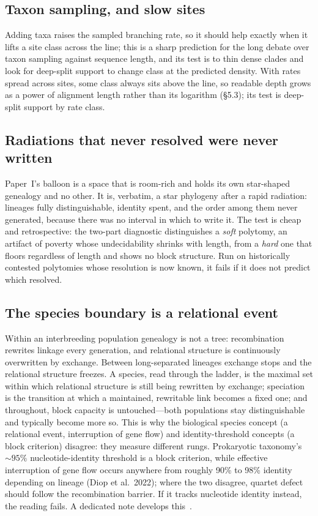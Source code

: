 \documentclass[11pt]{article}
\begin{document}
\subsection{Taxon sampling, and slow sites}
Adding taxa raises the sampled branching rate, so it should help exactly when it lifts a site class across the line; this is a sharp prediction for the long debate over taxon sampling against sequence length, and its test is to thin dense clades and look for deep-split support to change class at the predicted density. With rates spread across sites, some class always sits above the line, so readable depth grows as a power of alignment length rather than its logarithm (\S5.3); its test is deep-split support by rate class.

\subsection{Radiations that never resolved were never written}
Paper~I's balloon is a space that is room-rich and holds its own star-shaped genealogy and no other. It is, verbatim, a star phylogeny after a rapid radiation: lineages fully distinguishable, identity spent, and the order among them never generated, because there was no interval in which to write it. The test is cheap and retrospective: the two-part diagnostic distinguishes a \emph{soft} polytomy, an artifact of poverty whose undecidability shrinks with length, from a \emph{hard} one that floors regardless of length and shows no block structure. Run on historically contested polytomies whose resolution is now known, it fails if it does not predict which resolved.

\subsection{The species boundary is a relational event}
Within an interbreeding population genealogy is not a tree: recombination rewrites linkage every generation, and relational structure is continuously overwritten by exchange. Between long-separated lineages exchange stops and the relational structure freezes. A species, read through the ladder, is the maximal set within which relational structure is still being rewritten by exchange; speciation is the transition at which a maintained, rewritable link becomes a fixed one; and throughout, block capacity is untouched---both populations stay distinguishable and typically become more so. This is why the biological species concept (a relational event, interruption of gene flow) and identity-threshold concepts (a block criterion) disagree: they measure different rungs. Prokaryotic taxonomy's $\sim95\%$ nucleotide-identity threshold is a block criterion, while effective interruption of gene flow occurs anywhere from roughly 90\% to 98\% identity depending on lineage (Diop et al.\ 2022); where the two disagree, quartet defect should follow the recombination barrier. If it tracks nucleotide identity instead, the reading fails. A dedicated note develops this~\cite{fennfenn2026iii}.
\end{document}
